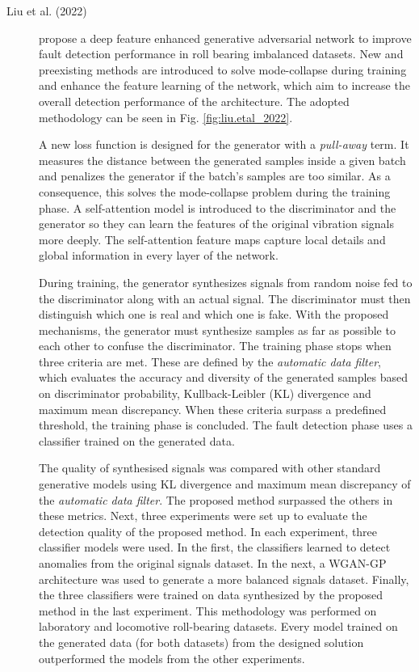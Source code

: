 \begin{description}
    \item[Liu et al. (2022) \cite{liu.etal_DataSynthesisUsing_2022}] propose a deep feature enhanced generative adversarial network to improve fault detection performance in roll bearing imbalanced datasets. New and preexisting methods are introduced to solve mode-collapse during training and enhance the feature learning of the network, which aim to increase the overall detection performance of the architecture. The adopted methodology can be seen in Fig. \ref{fig:liu.etal_2022}.

    A new loss function is designed for the generator with a \textit{pull-away} term. It measures the distance between the generated samples inside a given batch and penalizes the generator if the batch's samples are too similar. As a consequence, this solves the mode-collapse problem during the training phase. A self-attention model is introduced to the discriminator and the generator so they can learn the features of the original vibration signals more deeply. The self-attention feature maps capture local details and global information in every layer of the network.

    During training, the generator synthesizes signals from random noise fed to the discriminator along with an actual signal. The discriminator must then distinguish which one is real and which one is fake. With the proposed mechanisms, the generator must synthesize samples as far as possible to each other to confuse the discriminator. The training phase stops when three criteria are met. These are defined by the \textit{automatic data filter}, which evaluates the accuracy and diversity of the generated samples based on discriminator probability, Kullback-Leibler (KL) divergence and maximum mean discrepancy.  When these criteria surpass a predefined threshold, the training phase is concluded. The fault detection phase uses a classifier trained on the generated data.  

    The quality of synthesised signals was compared with other standard generative models using KL divergence and maximum mean discrepancy of the \textit{automatic data filter}. The proposed method surpassed the others in these metrics. Next, three experiments were set up to evaluate the detection quality of the proposed method. In each experiment, three classifier models were used. In the first, the classifiers learned to detect anomalies from the original signals dataset. In the next, a WGAN-GP architecture was used to generate a more balanced signals dataset. Finally, the three classifiers were trained on data synthesized by the proposed method in the last experiment. This methodology was performed on laboratory and locomotive roll-bearing datasets. Every model trained on the generated data (for both datasets) from the designed solution outperformed the models from the other experiments.

    
\end{description}

